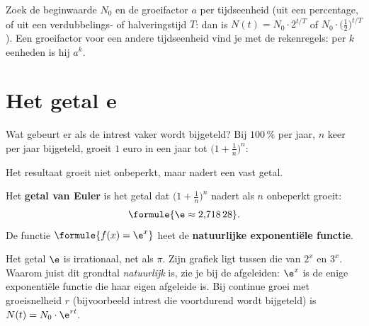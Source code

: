 \begin{werkwijze}
Zoek de beginwaarde $N_0$ en de groeifactor $a$ per tijdseenheid (uit een percentage, of uit een verdubbelings- of halveringstijd $T$: dan is $N(t) = N_0 \cdot 2^{t/T}$ of $N_0 \cdot \bigl(\frac12\bigr)^{t/T}$). Een groeifactor voor een andere tijdseenheid vind je met de rekenregels: per $k$ eenheden is hij $a^k$.
\end{werkwijze}

\begin{oefeningen}

\end{oefeningen}

\section{Het getal e}

Wat gebeurt er als de intrest vaker wordt bijgeteld? Bij $100$\,\% per jaar, $n$ keer per jaar bijgeteld, groeit $1$ euro in een jaar tot $\bigl(1 + \frac1n\bigr)^n$:


Het resultaat groeit niet onbeperkt, maar nadert een vast getal.

\begin{theorie}
Het \textbf{\textcolor{accent}{getal van Euler}} is het getal dat $\bigl(1 + \frac1n\bigr)^n$ nadert als $n$ onbeperkt groeit:
\[\formule{\e \approx 2{,}718\,28}.\]
De functie $\formule{f(x) = \e^x}$ heet de \textbf{\textcolor{accent}{natuurlijke exponentiële functie}}.
\end{theorie}

Het getal $\e$ is irrationaal, net als $\pi$. Zijn grafiek ligt tussen die van $2^x$ en $3^x$. Waarom juist dit grondtal \textit{natuurlijk} is, zie je bij de afgeleiden: $\e^x$ is de enige exponentiële functie die haar eigen afgeleide is. Bij continue groei met groeisnelheid $r$ (bijvoorbeeld intrest die voortdurend wordt bijgeteld) is $N(t) = N_0 \cdot \e^{rt}$.


